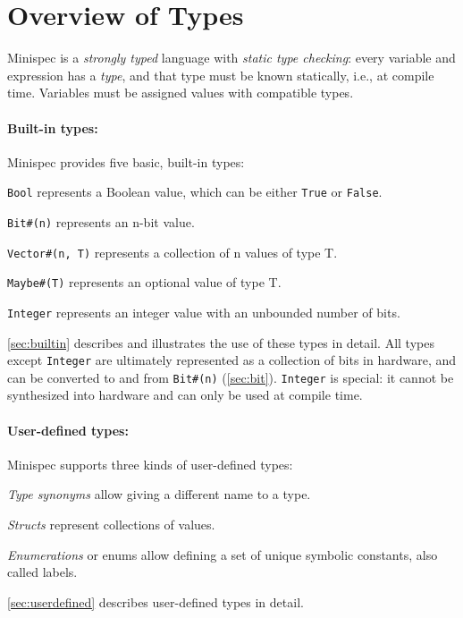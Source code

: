 \section{Overview of Types}
\label{sec:types}

Minispec is a \emph{strongly typed} language with \emph{static type checking}:
every variable and expression has a \emph{type},
and that type must be known statically, i.e., at compile time.
Variables must be assigned values with compatible types.

\paragraph{Built-in types:} Minispec provides five basic, built-in types:
\begin{compactitem}
\item \texttt{Bool} represents a Boolean value, which can be either \texttt{True} or \texttt{False}.
\item \texttt{Bit\#(n)} represents an n-bit value.
\item \texttt{Vector\#(n, T)} represents a collection of n values of type T.
\item \texttt{Maybe\#(T)} represents an optional value of type T.
\item \texttt{Integer} represents an integer value with an unbounded number of bits.
\end{compactitem}
\autoref{sec:builtin} describes and illustrates the use of these types in detail.
All types except \texttt{Integer} are ultimately represented as a collection of bits in hardware,
and can be converted to and from \texttt{Bit\#(n)} (\autoref{sec:bit}).
\texttt{Integer} is special: it cannot be synthesized into hardware
and can only be used at compile time.

\paragraph{User-defined types:} Minispec supports three kinds of user-defined types:
\begin{compactitem}
\item \emph{Type synonyms} allow giving a different name to a type.
\item \emph{Structs} represent collections of values.
\item \emph{Enumerations} or enums allow defining a set of unique symbolic constants, also called labels.
\end{compactitem}
\autoref{sec:userdefined} describes user-defined types in detail.

